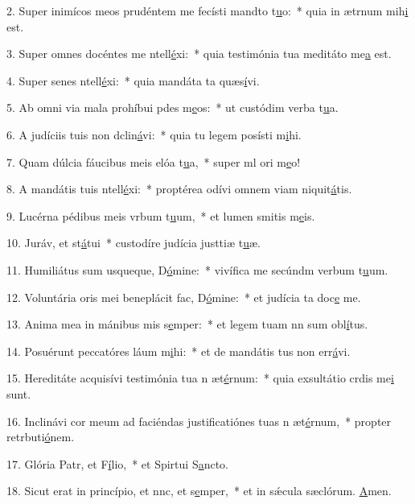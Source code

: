 2. Super inimícos meos prudéntem me fecísti mandto t\uline{u}o:~* quia in ætrnum mih\uline{i} est.\par 
3. Super omnes docéntes me ntell\uline{é}xi:~* quia testimónia tua meditáto me\uline{a} est.\par 
4. Super senes ntell\uline{é}xi:~* quia mandáta ta quæs\uline{í}vi.\par 
5. Ab omni via mala prohíbui pdes m\uline{e}os:~* ut custódim verba t\uline{u}a.\par 
6. A judíciis tuis non dclin\uline{á}vi:~* quia tu legem posísti m\uline{i}hi.\par 
7. Quam dúlcia fáucibus meis elóa t\uline{u}a,~* super ml ori m\uline{e}o!\par 
8. A mandátis tuis ntell\uline{é}xi:~* proptérea odívi omnem viam niquit\uline{á}tis.\par 
9. Lucérna pédibus meis vrbum t\uline{u}um,~* et lumen smitis m\uline{e}is.\par 
10. Juráv, et st\uline{á}tui~* custodíre judícia justtiæ t\uline{u}æ.\par 
11. Humiliátus sum usqueque, D\uline{ó}mine:~* vivífica me secúndm verbum t\uline{u}um.\par 
12. Voluntária oris mei beneplácit fac, D\uline{ó}mine:~* et judícia ta doc\uline{e} me.\par 
13. Anima mea in mánibus mis s\uline{e}mper:~* et legem tuam nn sum obl\uline{í}tus.\par 
14. Posuérunt peccatóres láum m\uline{i}hi:~* et de mandátis tus non err\uline{á}vi.\par 
15. Hereditáte acquisívi testimónia tua n æt\uline{é}rnum:~* quia exsultátio crdis me\uline{i} sunt.\par 
16. Inclinávi cor meum ad faciéndas justificatiónes tuas n æt\uline{é}rnum,~* propter retrbuti\uline{ó}nem.\par 
17. Glória Patr, et F\uline{í}lio,~* et Spirtui S\uline{a}ncto.\par 
18. Sicut erat in princípio, et nnc, et s\uline{e}mper,~* et in sǽcula sæclórum. \uline{A}men.\par 
